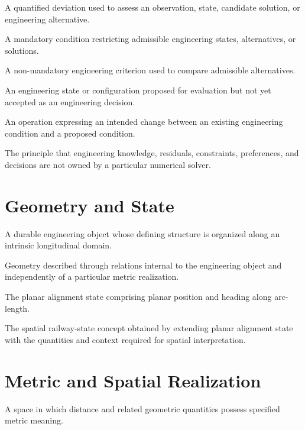 {A quantified deviation used to assess an observation, state, candidate
solution, or engineering alternative.}

{A mandatory condition restricting admissible engineering states,
alternatives, or solutions.}

{A non-mandatory engineering criterion used to compare admissible
alternatives.}

{An engineering state or configuration proposed for evaluation but not
yet accepted as an engineering decision.}

{An operation expressing an intended change between an existing
engineering condition and a proposed condition.}

{The principle that engineering knowledge, residuals, constraints,
preferences, and decisions are not owned by a particular numerical
solver.}

\section*{Geometry and State}

{A durable engineering object whose defining structure is organized
along an intrinsic longitudinal domain.}

{Geometry described through relations internal to the engineering object
and independently of a particular metric realization.}

{The planar alignment state comprising planar position and heading along
arc-length.}

{The spatial railway-state concept obtained by extending planar
alignment state with the quantities and context required for spatial
interpretation.}

\section*{Metric and Spatial Realization}

{A space in which distance and related geometric quantities possess
specified metric meaning.}

